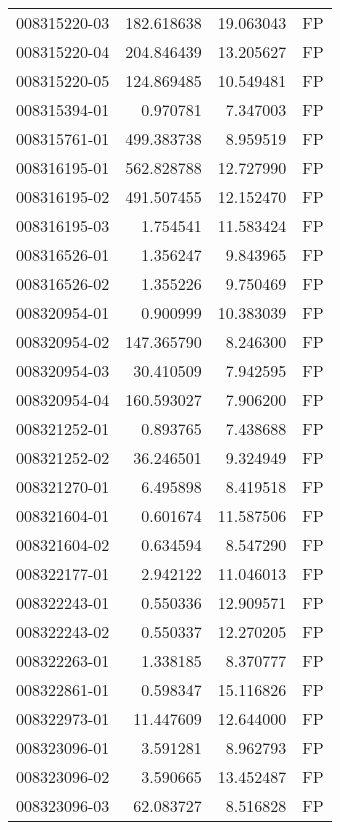 \begin{tabular}{lrrl}
008315220-03 &  182.618638 &      19.063043 &   FP \\
008315220-04 &  204.846439 &      13.205627 &   FP \\
008315220-05 &  124.869485 &      10.549481 &   FP \\
008315394-01 &    0.970781 &       7.347003 &   FP \\
008315761-01 &  499.383738 &       8.959519 &   FP \\
008316195-01 &  562.828788 &      12.727990 &   FP \\
008316195-02 &  491.507455 &      12.152470 &   FP \\
008316195-03 &    1.754541 &      11.583424 &   FP \\
008316526-01 &    1.356247 &       9.843965 &   FP \\
008316526-02 &    1.355226 &       9.750469 &   FP \\
008320954-01 &    0.900999 &      10.383039 &   FP \\
008320954-02 &  147.365790 &       8.246300 &   FP \\
008320954-03 &   30.410509 &       7.942595 &   FP \\
008320954-04 &  160.593027 &       7.906200 &   FP \\
008321252-01 &    0.893765 &       7.438688 &   FP \\
008321252-02 &   36.246501 &       9.324949 &   FP \\
008321270-01 &    6.495898 &       8.419518 &   FP \\
008321604-01 &    0.601674 &      11.587506 &   FP \\
008321604-02 &    0.634594 &       8.547290 &   FP \\
008322177-01 &    2.942122 &      11.046013 &   FP \\
008322243-01 &    0.550336 &      12.909571 &   FP \\
008322243-02 &    0.550337 &      12.270205 &   FP \\
008322263-01 &    1.338185 &       8.370777 &   FP \\
008322861-01 &    0.598347 &      15.116826 &   FP \\
008322973-01 &   11.447609 &      12.644000 &   FP \\
008323096-01 &    3.591281 &       8.962793 &   FP \\
008323096-02 &    3.590665 &      13.452487 &   FP \\
008323096-03 &   62.083727 &       8.516828 &   FP \\

\end{tabular}
